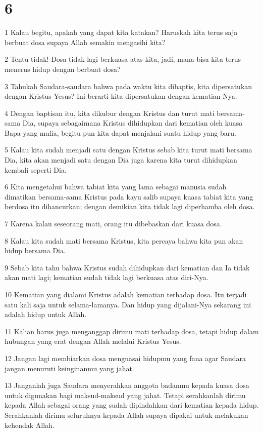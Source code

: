 \chapter{6}

\par 1 Kalau begitu, apakah yang dapat kita katakan? Haruskah kita terus saja berbuat dosa supaya Allah semakin mengasihi kita?
\par 2 Tentu tidak! Dosa tidak lagi berkuasa atas kita, jadi, mana bisa kita terus-menerus hidup dengan berbuat dosa?
\par 3 Tahukah Saudara-saudara bahwa pada waktu kita dibaptis, kita dipersatukan dengan Kristus Yesus? Ini berarti kita dipersatukan dengan kematian-Nya.
\par 4 Dengan baptisan itu, kita dikubur dengan Kristus dan turut mati bersama-sama Dia, supaya sebagaimana Kristus dihidupkan dari kematian oleh kuasa Bapa yang mulia, begitu pun kita dapat menjalani suatu hidup yang baru.
\par 5 Kalau kita sudah menjadi satu dengan Kristus sebab kita turut mati bersama Dia, kita akan menjadi satu dengan Dia juga karena kita turut dihidupkan kembali seperti Dia.
\par 6 Kita mengetahui bahwa tabiat kita yang lama sebagai manusia sudah dimatikan bersama-sama Kristus pada kayu salib supaya kuasa tabiat kita yang berdosa itu dihancurkan; dengan demikian kita tidak lagi diperhamba oleh dosa.
\par 7 Karena kalau seseorang mati, orang itu dibebaskan dari kuasa dosa.
\par 8 Kalau kita sudah mati bersama Kristus, kita percaya bahwa kita pun akan hidup bersama Dia.
\par 9 Sebab kita tahu bahwa Kristus sudah dihidupkan dari kematian dan Ia tidak akan mati lagi; kematian sudah tidak lagi berkuasa atas diri-Nya.
\par 10 Kematian yang dialami Kristus adalah kematian terhadap dosa. Itu terjadi satu kali saja untuk selama-lamanya. Dan hidup yang dijalani-Nya sekarang ini adalah hidup untuk Allah.
\par 11 Kalian harus juga menganggap dirimu mati terhadap dosa, tetapi hidup dalam hubungan yang erat dengan Allah melalui Kristus Yesus.
\par 12 Jangan lagi membiarkan dosa menguasai hidupmu yang fana agar Saudara jangan menuruti keinginanmu yang jahat.
\par 13 Janganlah juga Saudara menyerahkan anggota badanmu kepada kuasa dosa untuk digunakan bagi maksud-maksud yang jahat. Tetapi serahkanlah dirimu kepada Allah sebagai orang yang sudah dipindahkan dari kematian kepada hidup. Serahkanlah dirimu seluruhnya kepada Allah supaya dipakai untuk melakukan kehendak Allah.
